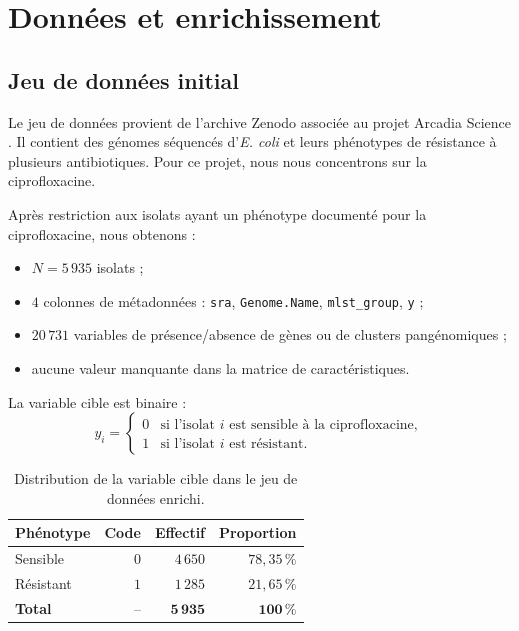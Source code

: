 \documentclass[11pt,a4paper]{article}
\begin{document}
\section{Données et enrichissement}

\subsection{Jeu de données initial}

Le jeu de données provient de l'archive Zenodo associée au projet Arcadia Science \citep{mets2024,zenodo2024}. Il contient des génomes séquencés d'\textit{E. coli} et leurs phénotypes de résistance à plusieurs antibiotiques. Pour ce projet, nous nous concentrons sur la ciprofloxacine.

Après restriction aux isolats ayant un phénotype documenté pour la ciprofloxacine, nous obtenons :
\begin{itemize}[leftmargin=1.2em]
    \item $N = 5\,935$ isolats ;
    \item $4$ colonnes de métadonnées : \texttt{sra}, \texttt{Genome.Name}, \texttt{mlst\_group}, \texttt{y} ;
    \item $20\,731$ variables de présence/absence de gènes ou de clusters pangénomiques ;
    \item aucune valeur manquante dans la matrice de caractéristiques.
\end{itemize}

La variable cible est binaire :
\[
y_i =
\begin{cases}
0 & \text{si l'isolat } i \text{ est sensible à la ciprofloxacine},\\
1 & \text{si l'isolat } i \text{ est résistant}.
\end{cases}
\]

\begin{table}[H]
\centering
\caption{Distribution de la variable cible dans le jeu de données enrichi.}
\label{tab:target}
\begin{tabular}{lrrr}
\toprule
\textbf{Phénotype} & \textbf{Code} & \textbf{Effectif} & \textbf{Proportion} \\
\midrule
Sensible & $0$ & $4\,650$ & $78{,}35\,\%$ \\
Résistant & $1$ & $1\,285$ & $21{,}65\,\%$ \\
\midrule
\textbf{Total} & -- & $\mathbf{5\,935}$ & $\mathbf{100\,\%}$ \\
\bottomrule
\end{tabular}
\end{table}
\end{document}
